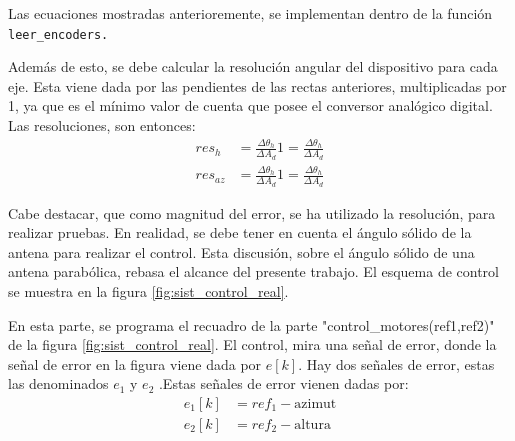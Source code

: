 Las ecuaciones mostradas anterioremente, se implementan dentro de la función \texttt{leer_encoders.} 

Además de esto, se debe calcular la resolución angular del dispositivo para cada eje. Esta viene dada por las pendientes de las rectas anteriores, multiplicadas por 1, ya que es el mínimo valor de cuenta que posee el conversor analógico digital. Las resoluciones, son entonces: 
\begin{equation}
	\begin{split}
		res_h &= \frac{ \Delta\theta_h}{\Delta A_d}  1 = \frac{ \Delta\theta_h}{\Delta A_d} \\  
		res_{az} &= \frac{ \Delta\theta_h}{\Delta A_d}  1 = \frac{ \Delta\theta_h}{\Delta A_d}   	
	\end{split}
\end{equation}

Cabe destacar, que como magnitud del error, se ha utilizado la resolución, para realizar pruebas. En realidad, se debe tener en cuenta el ángulo sólido de la antena para realizar el control. Esta discusión, sobre el ángulo sólido de una antena parabólica, rebasa el alcance del presente trabajo.
El esquema de control se muestra en la figura  \ref{fig:sist_control_real}. 

En esta parte, se programa el recuadro de la parte "control\_motores(ref1,ref2)" de la figura \ref{fig:sist_control_real}. El control, mira una señal de error, donde la señal de error en la figura viene dada por $e[k]$. Hay dos señales de error, estas las denominados $e_1 $ y $e_2$ .Estas señales de error vienen dadas por: 
\begin{equation}
	\begin{split}
		e_1[k]&=ref_1 - \text{azimut}  \\
	    e_2[k]&=ref_2 - \text{altura}  
	\end{split}
\end{equation}

